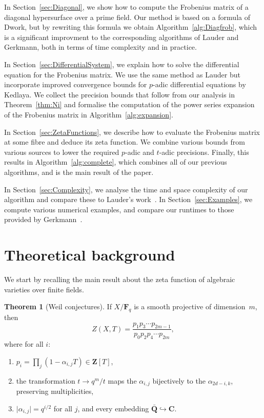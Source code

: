 \documentclass[a4paper,11pt]{article}
\numberwithin{equation}{section}
\providecommand{\abs}[1]{\lvert#1\rvert}                 %
\newcommand{\ZZ}{\mathbf{Z}} %
\newcommand{\QQ}{\mathbf{Q}} %
\newcommand{\CC}{\mathbf{C}} %
\newcommand{\FF}{\mathbf{F}} %
\theoremstyle{definition}
\newtheorem{thm}{Theorem}[section]
\begin{document}
In Section~\ref{sec:Diagonal}, we show how to compute the Frobenius matrix of
a diagonal hypersurface over a prime field. Our method is based on a formula 
of Dwork, but by rewriting this formula we obtain Algorithm~\ref{alg:Diagfrob}, 
which is a significant improvment to the corresponding algorithms of Lauder 
and Gerkmann, both in terms of time complexity and in practice.

In Section~\ref{sec:DifferentialSystem}, we explain how to solve the 
differential equation for the Frobenius matrix. We use the same method as 
Lauder but incorporate improved convergence bounds for $p$-adic differential 
equations by Kedlaya. We collect the precision bounds that follow from our 
analysis in Theorem~\ref{thm:Ni} and formalise the computation of the power 
series expansion of the Frobenius matrix in Algorithm~\ref{alg:expansion}.

In Section~\ref{sec:ZetaFunctions}, we describe how to evaluate the Frobenius 
matrix at some fibre and deduce its zeta function. We combine various bounds 
from various sources to lower the required $p$-adic and $t$-adic precisions. 
Finally, this results in Algorithm~\ref{alg:complete}, which combines all of 
our previous algorithms, and is the main result of the paper.

In Section~\ref{sec:Complexity}, we analyse the time and space complexity of 
our algorithm and compare these to Lauder's work~\citep{Lauder2004a}. 
In Section~\ref{sec:Examples}, we compute various numerical examples, and 
compare our runtimes to those provided by Gerkmann~\citep{Gerkmann2007}. 

\section{Theoretical background}
\label{sec:Background}

We start by recalling the main result about the zeta function of algebraic
varieties over finite fields.

\begin{thm}[Weil conjectures] If $X/\FF_q$ is a smooth projective of 
dimension~$m$, then \label{thm:weildeligne}
\[
Z(X,T)=\frac{p_1 p_3 \dotsm p_{2m-1}}{p_0 p_2 p_4 \dotsm p_{2m}},
\]
where for all $i$:
\begin{enumerate}
\item $p_i = \prod_j (1-\alpha_{i,j}T) \in \ZZ[T]$, 
\item the transformation $t \rightarrow q^m/t$ maps the $\alpha_{i,j}$ 
      bijectively to the $\alpha_{2d-i,k}$, preserving multiplicities,
\item $\abs{\alpha_{i,j}} = q^{i/2}$ for all $j$, and every embedding 
      $\bar{\QQ} \hookrightarrow \CC$. 
\end{enumerate}
\end{thm}
\end{document}
